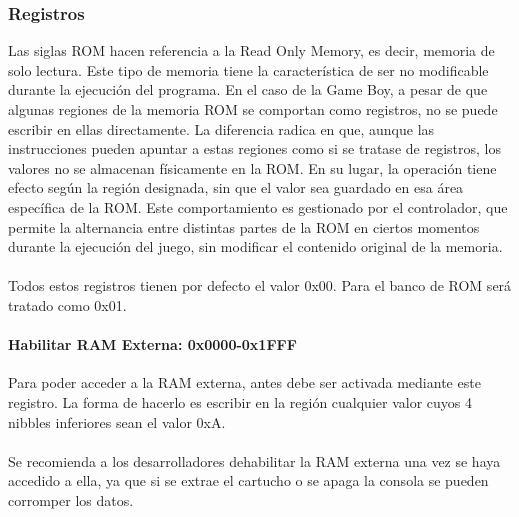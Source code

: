 \subsubsection{Registros}

Las siglas ROM hacen referencia a la Read Only Memory, es decir, memoria de solo lectura. Este tipo de memoria tiene la característica de ser no modificable durante la ejecución del programa. En el caso de la Game Boy, a pesar de que algunas regiones de la memoria ROM se comportan como registros, no se puede escribir en ellas directamente. La diferencia radica en que, aunque las instrucciones pueden apuntar a estas regiones como si se tratase de registros, los valores no se almacenan físicamente en la ROM. En su lugar, la operación tiene efecto según la región designada, sin que el valor sea guardado en esa área específica de la ROM. Este comportamiento es gestionado por el controlador, que permite la alternancia entre distintas partes de la ROM en ciertos momentos durante la ejecución del juego, sin modificar el contenido original de la memoria.
\\\\
Todos estos registros tienen por defecto el valor 0x00. Para el banco de ROM será tratado como 0x01.

\paragraph{Habilitar RAM Externa: 0x0000-0x1FFF}
Para poder acceder a la RAM externa, antes debe ser activada mediante este registro. La forma de hacerlo es escribir en la región cualquier valor cuyos 4 nibbles inferiores sean el valor 0xA.
\\\\
Se recomienda a los desarrolladores dehabilitar la RAM externa una vez se haya accedido a ella, ya que si se extrae el cartucho o se apaga la consola se pueden corromper los datos.

